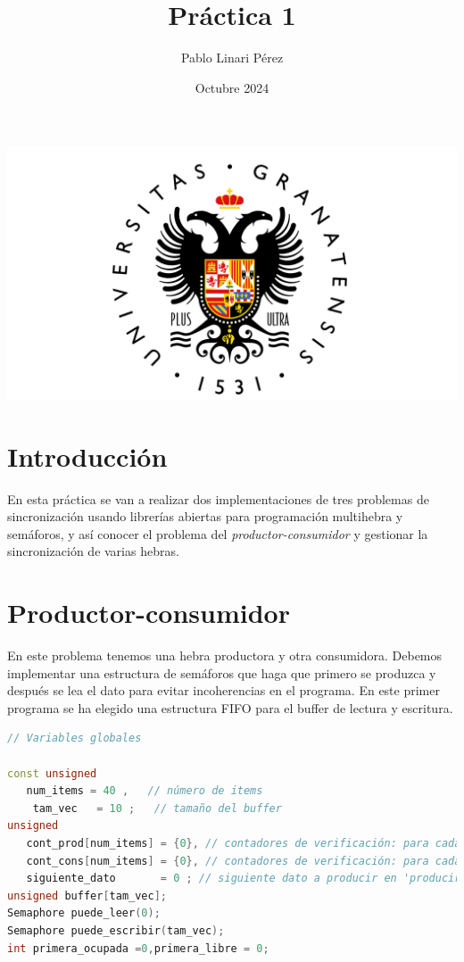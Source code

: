 \documentclass{article}
\title{Práctica 1}
\author{Pablo Linari Pérez}
\date{Octubre 2024}
\begin{document}
\maketitle
\begin{center}
    \includegraphics[width=1\textwidth]{UGR-Logo.png} %
\end{center}
\newpage
\tableofcontents

\newpage

\section{Introducción}
En esta práctica se van a realizar dos implementaciones de tres problemas de sincronización usando librerías abiertas para programación multihebra y semáforos, y así conocer el problema del \textit{productor-consumidor} y gestionar la sincronización de varias hebras. 

\section{Productor-consumidor}
En este problema tenemos una hebra productora y otra consumidora. Debemos implementar una estructura de semáforos que haga que primero se produzca y después se lea el dato para evitar incoherencias en el programa. En este primer programa se ha elegido una estructura FIFO para el buffer de lectura y escritura.

\begin{lstlisting}[language=C++,caption=Variables globales para el problema productor-consumidor]
// Variables globales

const unsigned 
   num_items = 40 ,   // número de items
	tam_vec   = 10 ;   // tamaño del buffer
unsigned  
   cont_prod[num_items] = {0}, // contadores de verificación: para cada dato, número de veces que se ha producido.
   cont_cons[num_items] = {0}, // contadores de verificación: para cada dato, número de veces que se ha consumido.
   siguiente_dato       = 0 ; // siguiente dato a producir en 'producir_dato' (solo se usa ahí)
unsigned buffer[tam_vec];
Semaphore puede_leer(0);
Semaphore puede_escribir(tam_vec);
int primera_ocupada =0,primera_libre = 0;
\end{lstlisting}
\end{document}
